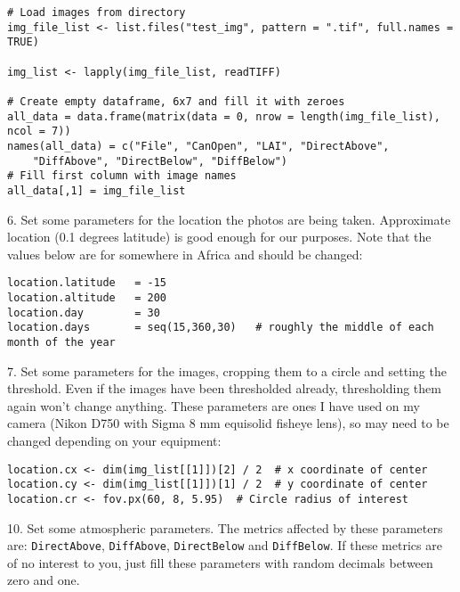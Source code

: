 \documentclass{article}
\begin{document}
\begin{minipage}{\linewidth}
\begin{lstlisting}
# Load images from directory 
img_file_list <- list.files("test_img", pattern = ".tif", full.names = TRUE)

img_list <- lapply(img_file_list, readTIFF)

# Create empty dataframe, 6x7 and fill it with zeroes
all_data = data.frame(matrix(data = 0, nrow = length(img_file_list), ncol = 7))
names(all_data) = c("File", "CanOpen", "LAI", "DirectAbove", 
	"DiffAbove", "DirectBelow", "DiffBelow")
# Fill first column with image names
all_data[,1] = img_file_list 
\end{lstlisting}
\end{minipage}

6. Set some parameters for the location the photos are being taken. Approximate location (0.1 degrees latitude) is good enough for our purposes. Note that the values below are for somewhere in Africa and should be changed:

\begin{minipage}{\linewidth}
\begin{lstlisting}
location.latitude   = -15
location.altitude   = 200
location.day        = 30
location.days       = seq(15,360,30)   # roughly the middle of each month of the year 
\end{lstlisting}
\end{minipage}

7. Set some parameters for the images, cropping them to a circle and setting the threshold. Even if the images have been thresholded already, thresholding them again won't change anything. These parameters are ones I have used on my camera (Nikon D750 with Sigma 8 mm equisolid fisheye lens), so may need to be changed depending on your equipment:

\begin{minipage}{\linewidth}
\begin{lstlisting}
location.cx <- dim(img_list[[1]])[2] / 2  # x coordinate of center
location.cy <- dim(img_list[[1]])[1] / 2  # y coordinate of center
location.cr <- fov.px(60, 8, 5.95)  # Circle radius of interest
\end{lstlisting}
\end{minipage}

10. Set some atmospheric parameters. The metrics affected by these parameters are: \verb|DirectAbove|, \verb|DiffAbove|, \verb|DirectBelow| and \verb|DiffBelow|. If these metrics are of no interest to you, just fill these parameters with random decimals between zero and one.
\end{document}
